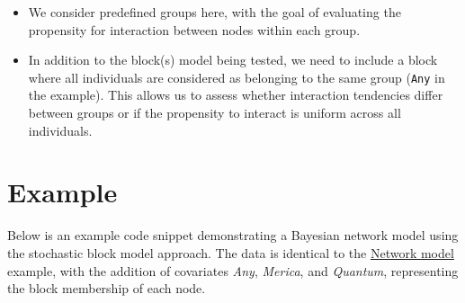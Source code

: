 \documentclass[
  letterpaper,
  DIV=11,
  numbers=noendperiod]{scrreprt}
\providecommand{\tightlist}{%
  \setlength{\itemsep}{0pt}\setlength{\parskip}{0pt}}\usepackage{longtable,booktabs,array}
\begin{document}
\begin{tcolorbox}[enhanced jigsaw, toptitle=1mm, opacityback=0, titlerule=0mm, breakable, bottomrule=.15mm, colframe=quarto-callout-caution-color-frame, arc=.35mm, coltitle=black, left=2mm, opacitybacktitle=0.6, leftrule=.75mm, toprule=.15mm, rightrule=.15mm, bottomtitle=1mm, colbacktitle=quarto-callout-caution-color!10!white, title=\textcolor{quarto-callout-caution-color}{\faFire}\hspace{0.5em}{Caution}, colback=white]

\begin{itemize}
\tightlist
\item
  We consider predefined groups here, with the goal of evaluating the
  propensity for interaction between nodes within each group.
\item
  In addition to the block(s) model being tested, we need to include a
  block where all individuals are considered as belonging to the same
  group (\texttt{Any} in the example). This allows us to assess whether
  interaction tendencies differ between groups or if the propensity to
  interact is uniform across all individuals.
\end{itemize}

\end{tcolorbox}

\section{Example}\label{example-18}

Below is an example code snippet demonstrating a Bayesian network model
using the stochastic block model approach. The data is identical to the
\href{18.\%20Network\%20model.qmd}{Network model} example, with the
addition of covariates \emph{Any}, \emph{Merica}, and \emph{Quantum},
representing the block membership of each node.
\end{document}
